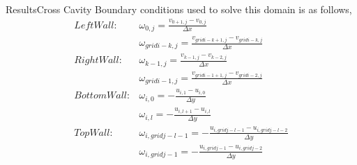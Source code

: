\documentclass[11pt]{beamer}
\begin{document}
\begin{frame}{Results}{Cross Cavity}
Boundary conditions used to solve this domain is as follows,
\begin{eqnarray}
Left Wall:&
\omega_{0,j}=\frac{v_{0+1,j}-v_{0,j}}{\Delta x} \nonumber\\
& \omega_{gridi-k,j}=\frac{v_{gridi-k+1,j}-v_{gridi-k,j}}{\Delta x} \nonumber\\
Right Wall:&
\omega_{k-1,j}=\frac{v_{k-1,j}-v_{k-2,j}}{\Delta x} \nonumber\\
& \omega_{gridi-1,j}=\frac{v_{gridi-1+1,j}-v_{gridi-2,j}}{\Delta x} \nonumber\\
Bottom Wall:& 
\omega_{i,0}=-\frac{u_{i,1}-u_{i,0}}{\Delta y} \nonumber\\
& \omega_{i,l}=-\frac{u_{i,l+1}-u_{i,l}}{\Delta y} \nonumber\\
Top Wall:&
\omega_{i,gridj-l-1}=-\frac{u_{i,gridj-l-1}-u_{i,gridj-l-2}}{\Delta y} \nonumber\\
& \omega_{i,gridj-1}=-\frac{u_{i,gridj-1}-u_{i,gridj-2}}{\Delta y} \nonumber
\end{eqnarray}


\end{frame}
\end{document}
